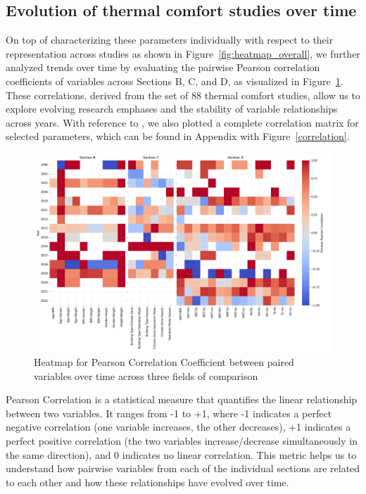\documentclass[final,3p,times,12pt]{elsarticle}
\begin{document}
\subsection{Evolution of thermal comfort studies over time}

On top of characterizing these parameters individually with respect to their representation across studies as shown in Figure~\ref{fig:heatmap_overall}, we further analyzed trends over time by evaluating the pairwise Pearson correlation coefficients of variables across Sections B, C, and D, as visualized in Figure~\ref{fig:heatmap_corr}. These correlations, derived from the set of 88 thermal comfort studies, allow us to explore evolving research emphases and the stability of variable relationships across years. With reference to \cite{nadarajahIdentificationApplicationBestsuited2024}, we also plotted a complete correlation matrix for selected parameters, which can be found in Appendix with Figure~\ref{correlation}.

\begin{figure}[h!]
    \centering
    \includegraphics[width=\linewidth]{Heatmap_yearcorr.png}
    \caption{Heatmap for Pearson Correlation Coefficient between paired variables over time across three fields of comparison}
    \label{fig:heatmap_corr}
\end{figure}

Pearson Correlation is a statistical measure that quantifies the linear relationship between two variables. It ranges from -1 to +1, where -1 indicates a perfect negative correlation (one variable increases, the other decreases), +1 indicates a perfect positive correlation (the two variables increase/decrease simultaneously in the same direction), and 0 indicates no linear correlation. This metric helps us to understand how pairwise variables from each of the individual sections are related to each other and how these relationships have evolved over time.
\end{document}
